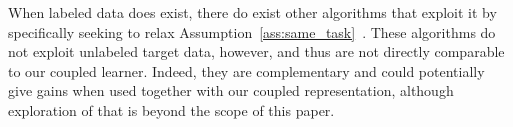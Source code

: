 When labeled data does exist, there do exist other algorithms that
exploit it by specifically seeking to relax
Assumption~\ref{ass:same_task}~\cite{argyriou07,daume07,finkel09}.
These algorithms do not exploit unlabeled target data, however, and
thus are not directly comparable to our coupled learner.  Indeed, they
are complementary and could potentially give gains when used together
with our coupled representation, although exploration of that is
beyond the scope of this paper.
